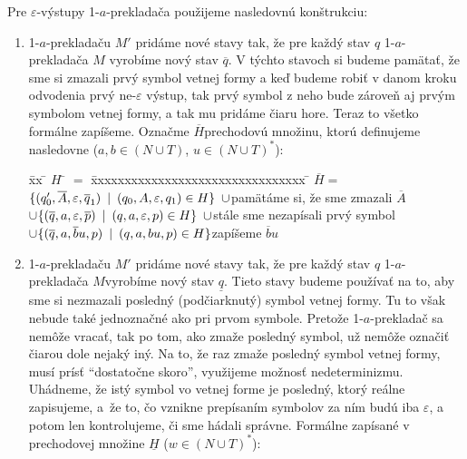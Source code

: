 \begin{dokaz}
\begin{enumerate}
  Pre $\varepsilon$-výstupy 1-$a$-prekladača použijeme nasledovnú
  konštrukciu:
  \begin{enumerate}
    \item 1-$a$-prekladaču $M'$ pridáme nové stavy tak, že pre každý
    stav $q$ 1-$a$-prekladača $M$ vyrobíme nový stav $\overline{q}$. V
    týchto stavoch si budeme pamätať, že sme si zmazali prvý symbol
    vetnej formy a keď budeme robiť v danom kroku odvodenia prvý
    ne-$\varepsilon$ výs\-tup, tak prvý symbol z neho bude zároveň aj
    prvým symbolom vetnej formy, a tak mu pridáme čiaru hore. Teraz to
    všetko formálne zapíšeme. Označme $\overline{H}$prechodovú
    množinu, ktorú definujeme nasledovne ($a,b\in (N\cup T)$, $u\in(N\cup T)^*$):
    \begin{tabbing}
      \= xx \= $H$ \= $=$ \= xxxxxxxxxxxxxxxxxxxxxxxxxxxxxxxx \= \kill
      \>\>$\overline{H}$\>$=$\>
      $\{(q'_0,\overline{A},\varepsilon,\overline{q}_1)\enspace |\enspace
      (q_0,A,\varepsilon,q_1)\in H\}\enspace\cup$\>pamätáme si, že sme
      zmazali $\overline{A}$
      \\ \>\>\>$\cup$\>$\{(\overline{q},a,\varepsilon,\overline{p})\enspace |\enspace
      (q,a,\varepsilon,p)\in H\}\enspace\cup$\>stále sme nezapísali prvý
      symbol \\ \>\>\>$\cup$\>$\{(\overline{q},a,\overline{b}u,p)\enspace |\enspace
      (q,a,bu,p)\in H\}$\>zapíšeme $\overline{b}u$
    \end{tabbing}
    \item 1-$a$-prekladaču $M'$ pridáme nové stavy tak, že pre každý
    stav $q$ 1-$a$-prekladača $M$\linebreak vyrobíme nový stav $\underline{q}$.
    Tieto stavy budeme používať na to, aby sme si nezmazali posledný
    (podčiarknutý) symbol vetnej formy. Tu to však nebude také
    jedno\-znač\-né ako pri prvom symbole. Pretože 1-$a$-prekladač sa
    nemôže vracať, tak po tom, ako zmaže posledný symbol, už nemôže
    označiť čiarou dole nejaký iný. Na to, že raz zmaže posledný
    symbol vetnej formy, musí prísť ``dostatočne skoro'', využijeme
    možnosť nedeterminizmu. Uhádneme, že istý symbol vo vetnej forme
    je posledný, ktorý reálne zapisujeme, \mbox{a že} to, čo vznikne
    prepísaním symbolov za ním budú iba $\varepsilon$, a potom len
    kontrolujeme, či sme hádali správne. Formálne zapísané v
    prechodovej množine $\underline{H}$ ($w\in(N\cup T)^*$):
\end{enumerate}
\end{enumerate}
\end{dokaz}
